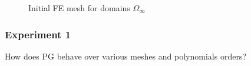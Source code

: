 \documentclass[aspectratio=169,xcolor=dvipsnames,11pt]{beamer}
\begin{document}
\begin{frame}
\begin{minipage}{.4\textwidth}
\begin{figure}
\begin{tikzpicture} [dot/.style={draw,rectangle,minimum size=4mm,inner sep=0pt,outer sep=0pt,thick}, step=2cm]
	\end{tikzpicture}
	\caption{\label{fig:ObstacleMesh}
	 Initial FE mesh for domains $\Omega_\infty$
	 }
\end{figure}
\end{minipage}
\end{frame}

\begin{frame}\frametitle{Experiment 1}
\begin{center}
{\color{Maroon} \Large How does PG behave over various meshes and polynomials orders?}
\end{center}
\end{frame}
\end{document}
